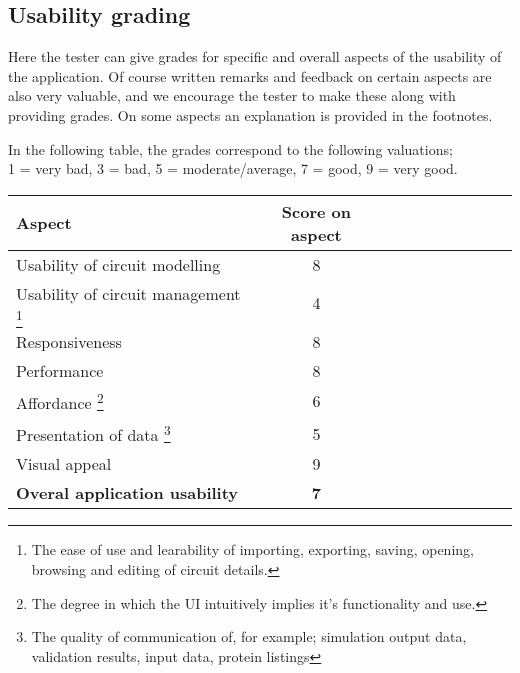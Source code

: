 \documentclass[a4paper]{article}
\begin{document}
\vfill
\subsection{Usability grading}
Here the tester can give grades for specific and overall aspects of the usability of the application. Of course written remarks and feedback on certain aspects are also very valuable, and we encourage the tester to make these along with providing grades. On some aspects an explanation is provided in the footnotes.

In the following table, the grades correspond to the following valuations;\\ 1 = very bad, 3 = bad, 5 = moderate/average, 7 = good, 9 = very good.
\begin{center}
\begin{tabularx}{\textwidth}{p{10cm} cc cc c cc cc} \toprule
\textbf{Aspect} & \multicolumn{1}{c}{\textbf{Score on aspect}} \\ \midrule
Usability of circuit modelling &8\\ \midrule
Usability of circuit management \footnote{The ease of use and learability of importing, exporting, saving, opening, browsing and editing of circuit details.} &4 \\ \midrule
Responsiveness &8 \\ \midrule
Performance &8 \\ \midrule
Affordance \footnote{The degree in which the UI intuitively implies it's functionality and use.} &6 \\ \midrule
Presentation of data \footnote{The quality of communication of, for example; simulation output data, validation results, input data, protein listings} &5 \\ \midrule
Visual appeal &9 \\ \midrule
\textbf{Overal application usability} &\textbf{7} \\ \bottomrule
\end{tabularx}
\end{center}
\end{document}
